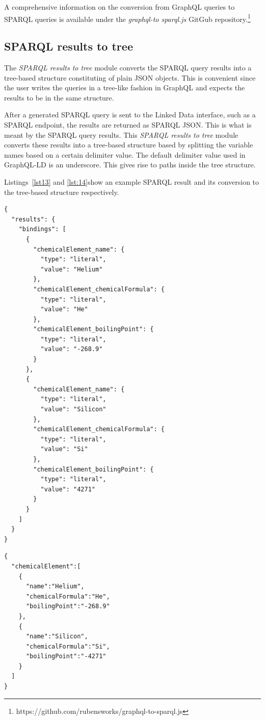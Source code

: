 A comprehensive information on the conversion from GraphQL queries to SPARQL queries is available under the \textit{graphql-to sparql.js} GitGub repository.\footnote{https://github.com/rubensworks/graphql-to-sparql.js}

\subsection{SPARQL results to tree}
\label{subsec:sparql-results-tree}
The \textit{SPARQL results to tree} module converts the SPARQL query results into a tree-based structure constituting of plain JSON objects. This is convenient since the user writes the queries in a tree-like fashion in GraphQL and expects the results to be in the same structure.

After a generated SPARQL query is sent to the Linked Data interface, such as a SPARQL endpoint, the results are returned as SPARQL JSON. This is what is meant by the SPARQL query results. This \textit{SPARQL results to tree} module converts these results into a tree-based structure based by splitting the variable names based on a certain delimiter value. The default delimiter value used in GraphQL-LD is an underscore. This gives rise to paths inside the tree structure.

Listings~\ref{lst13} and \ref{lst:14}show an example SPARQL result and its conversion to the tree-based structure respectively.

\begin{minipage}{\linewidth}
\begin{lstlisting}[label=lst:13, caption={A SPARQL Algebra result}, language=GraphQLException]
{
  "results": {
    "bindings": [
      { 
        "chemicalElement_name": { 
          "type": "literal", 
          "value": "Helium" 
        }, 
        "chemicalElement_chemicalFormula": { 
          "type": "literal", 
          "value": "He" 
        }, 
        "chemicalElement_boilingPoint": { 
          "type": "literal", 
          "value": "-268.9" 
        } 
      },
      { 
        "chemicalElement_name": { 
          "type": "literal", 
          "value": "Silicon" 
        }, 
        "chemicalElement_chemicalFormula": { 
          "type": "literal", 
          "value": "Si" 
        }, 
        "chemicalElement_boilingPoint": { 
          "type": "literal", 
          "value": "4271" 
        } 
      }
    ]
  }
}
\end{lstlisting}
\end{minipage}

\begin{minipage}{\linewidth}
\begin{lstlisting}[label=lst:14, caption={Tree-based JSON result}, language=GraphQLException2]
{
  "chemicalElement":[
    {
      "name":"Helium",
      "chemicalFormula":"He",
      "boilingPoint":"-268.9"
    },
    {
      "name":"Silicon",
      "chemicalFormula":"Si",
      "boilingPoint":"-4271"
    }
  ]
}
\end{lstlisting}
\end{minipage}

